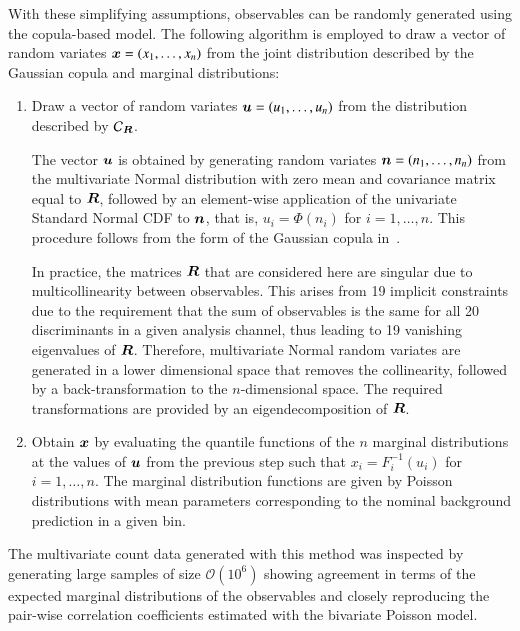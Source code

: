 With these simplifying assumptions, observables can be randomly generated using
the copula-based model. The following algorithm is employed to draw a vector of
random variates $\bm{x} = (x_1, \dots, x_n)$ from the joint distribution
described by the Gaussian copula and marginal distributions:
\begin{enumerate}

\item Draw a vector of random variates $\bm{u} = (u_1, \dots, u_n)$ from the
  distribution described by $\mathcal{C}_{\bm{R}}$.

  The vector $\bm{u}$ is obtained by generating random variates
  $\bm{n} = (n_1, \dots, n_n)$ from the multivariate Normal distribution with
  zero mean and covariance matrix equal to $\bm{R}$, followed by an
  element-wise application of the univariate Standard Normal CDF to $\bm{n}$,
  that is, $u_i = \Phi(n_i)$ for $i = 1, \dots, n$. This procedure follows from
  the form of the Gaussian copula in~.

  In practice, the matrices $\bm{R}$ that are considered here are singular
  due to multicollinearity between observables. This arises from 19 implicit
  constraints due to the requirement that the sum of observables is the same for
  all 20 discriminants in a given analysis channel, thus leading to 19 vanishing
  eigenvalues of $\bm{R}$. Therefore, multivariate Normal random variates are
  generated in a lower dimensional space that removes the collinearity, followed
  by a back-transformation to the $n$-dimensional space. The required
  transformations are provided by an eigendecomposition of $\bm{R}$.

\item Obtain $\bm{x}$ by evaluating the quantile functions of the $n$
  marginal distributions at the values of $\bm{u}$ from the previous step
  such that $x_i = F_{i}^{-1}(u_i)$ for $i = 1, \dots, n$. The marginal
  distribution functions are given by Poisson distributions with mean parameters
  corresponding to the nominal background prediction in a given bin.

\end{enumerate}
The multivariate count data generated with this method was inspected by
generating large samples of size $\mathcal{O}(10^6)$ showing agreement in terms
of the expected marginal distributions of the observables and closely
reproducing the pair-wise correlation coefficients estimated with the bivariate
Poisson model.


